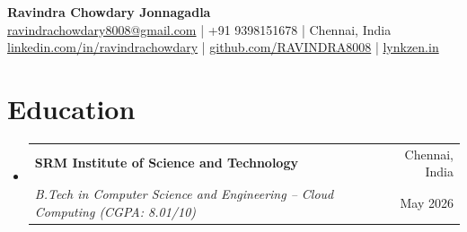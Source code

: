 \documentclass[letterpaper,10pt]{article}
\makeatletter
\newcommand{\resumeSubheading}[4]{
  \vspace{-2.5pt}\item
    \begin{tabular*}{0.99\textwidth}[t]{l@{\extracolsep{\fill}}r}
      \small\textbf{#1} & \small#2 \\
      \textit{\small#3} & \small#4 \\
    \end{tabular*}\vspace{-4pt}
}
\newcommand{\resumeSubHeadingListStart}{\begin{itemize}[leftmargin=0.0in, label={}]}
\newcommand{\resumeSubHeadingListEnd}{\end{itemize}\vspace{-3pt}}
\makeatother
\begin{document}
\begin{center}
    {\fontsize{18}{21}\selectfont \textbf{Ravindra Chowdary Jonnagadla}} \\ \vspace{2.5pt}
    \small
    \href{mailto:ravindrachowdary8008@gmail.com}{ravindrachowdary8008@gmail.com} \enspace|\enspace
    +91 9398151678 \enspace|\enspace
    Chennai, India \\ \vspace{1.5pt}
    \href{https://linkedin.com/in/ravindrachowdary}{linkedin.com/in/ravindrachowdary} \enspace|\enspace
    \href{https://github.com/RAVINDRA8008}{github.com/RAVINDRA8008} \enspace|\enspace
    \href{https://lynkzen.in}{lynkzen.in}
\end{center}
\vspace{-10pt}

\section{Education}
  \resumeSubHeadingListStart
    \resumeSubheading
      {SRM Institute of Science and Technology}{Chennai, India}
      {B.Tech in Computer Science and Engineering -- Cloud Computing \textnormal{(CGPA: 8.01/10)}}{May 2026}
  \resumeSubHeadingListEnd
\vspace{-5pt}

\end{document}
